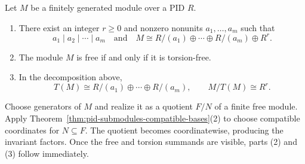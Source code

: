\begin{theorem}\label{thm:pid-structure-existence}
Let \(M\) be a finitely generated module over a PID \(R\).
\begin{enumerate}
\item There exist an integer \(r\geq0\) and nonzero nonunits
\(a_1,\ldots,a_m\) such that
\[
a_1\mid a_2\mid\cdots\mid a_m
\quad\text{and}\quad
M\cong R/(a_1)\oplus\cdots\oplus R/(a_m)\oplus R^r.
\]
\item The module \(M\) is free if and only if it is torsion-free.
\item In the decomposition above,
\[
T(M)\cong R/(a_1)\oplus\cdots\oplus R/(a_m),
\qquad M/T(M)\cong R^r.
\]
\end{enumerate}
\end{theorem}
\begin{proofidea}
Choose generators of \(M\) and realize it as a quotient \(F/N\) of a finite
free module. Apply Theorem~\ref{thm:pid-submodules-compatible-bases}(2) to
choose compatible coordinates for \(N\subseteq F\). The quotient becomes
coordinatewise, producing the invariant factors. Once the free and torsion
summands are visible, parts (2) and (3) follow immediately.
\end{proofidea}
